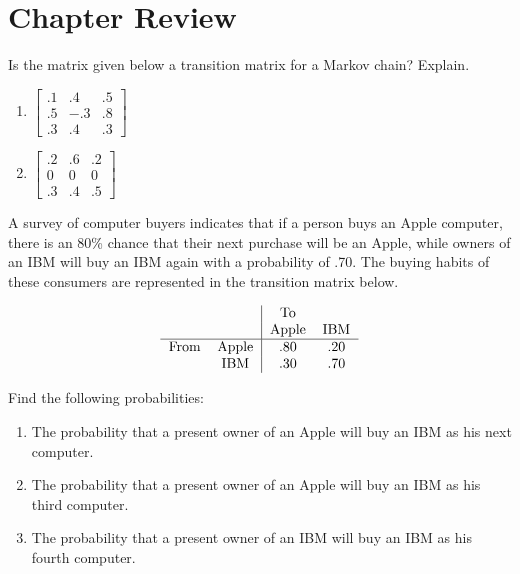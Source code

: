 \section{Chapter Review}

\begin{puzzle}
    Is the matrix given below a transition matrix for a Markov chain? Explain.
    \begin{enumerate}
        \item $\begin{bmatrix} .1 & .4 & .5 \\ .5 & -.3 & .8 \\ .3 & .4 & .3 \end{bmatrix}$
        \item $\begin{bmatrix} .2 & .6 & .2 \\ 0 & 0 & 0 \\ .3 & .4 & .5 \end{bmatrix}$
    \end{enumerate}
\end{puzzle}

\begin{puzzle}
    A survey of computer buyers indicates that if a person buys an Apple computer, there is an 80\% chance that their next purchase will be an Apple, while owners of an IBM will buy an IBM again with a probability of .70. The buying habits of these consumers are represented in the transition matrix below.

    \[
        \begin{tabular}{lc|cc}
                 &       & To    &     \\
                 &       & Apple & IBM \\
            \hline
            From & Apple & .80   & .20 \\
                 & IBM   & .30   & .70 \\
        \end{tabular}
    \]

    Find the following probabilities:
    \begin{enumerate}
        \item The probability that a present owner of an Apple will buy an IBM as his next computer.
        \item The probability that a present owner of an Apple will buy an IBM as his third computer.
        \item The probability that a present owner of an IBM will buy an IBM as his fourth computer.
    \end{enumerate}
\end{puzzle}



